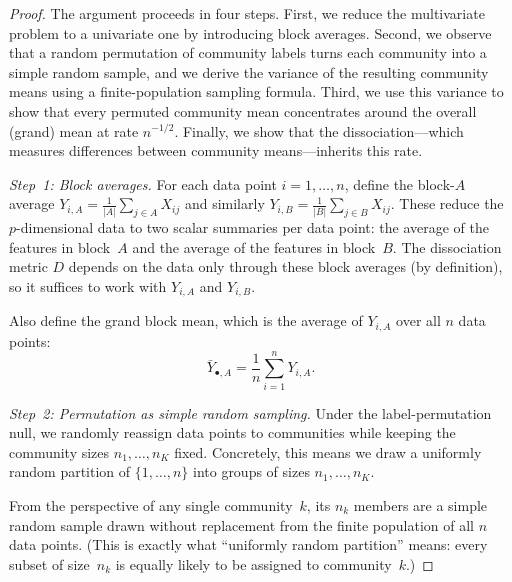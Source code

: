 \documentclass[hidelinks]{siamart251216}
\begin{document}
\begin{proof}
  The argument proceeds in four steps.  First, we reduce the
  multivariate problem to a univariate one by introducing block
  averages.  Second, we observe that a random permutation of community
  labels turns each community into a simple random sample, and we
  derive the variance of the resulting community means using a
  finite-population sampling formula.  Third, we use this variance to
  show that every permuted community mean concentrates around the
  overall (grand) mean at rate $n^{-1/2}$.  Finally, we show that the
  dissociation---which measures differences between community
  means---inherits this rate.

  \emph{Step~1: Block averages.}
  For each data point $i = 1, \ldots, n$, define the block-$A$ average
  $Y_{i,A} = \frac{1}{|A|}\sum_{j \in A} X_{ij}$ and similarly
  $Y_{i,B} = \frac{1}{|B|}\sum_{j \in B} X_{ij}$.  These reduce the
  $p$-dimensional data to two scalar summaries per data point: the
  average of the features in block~$A$ and the average of the features
  in block~$B$.  The dissociation metric $D$ depends on the data only
  through these block averages (by definition), so it suffices to work
  with $Y_{i,A}$ and $Y_{i,B}$.

  Also define the grand block mean, which is the average of $Y_{i,A}$
  over all $n$ data points:
  \[
    \bar{Y}_{\bullet,A}
    = \frac{1}{n}\sum_{i=1}^n Y_{i,A}.
  \]

  \emph{Step~2: Permutation as simple random sampling.}
  Under the label-permutation null, we randomly reassign data points
  to communities while keeping the community sizes $n_1, \ldots, n_K$
  fixed.  Concretely, this means we draw a uniformly random partition
  of $\{1, \ldots, n\}$ into groups of sizes $n_1, \ldots, n_K$.

  From the perspective of any single community~$k$, its $n_k$ members
  are a simple random sample drawn without replacement from the finite
  population of all $n$ data points.  (This is exactly what ``uniformly
  random partition'' means: every subset of size~$n_k$ is equally
  likely to be assigned to community~$k$.)


\end{proof}
\end{document}
